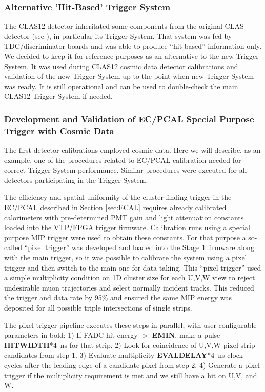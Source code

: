 \subsubsection{Alternative 'Hit-Based' Trigger System}

The CLAS12 detector inheritated some components from the original CLAS detector (see \cite{clas-nim}), in particular its Trigger System. That system was fed by TDC/discriminator boards and was able to produce ``hit-based'' information only. We decided to keep it for reference purposes as an alternative to the new Trigger System. It was used during CLAS12 cosmic data detector calibrations and validation of the new Trigger System up to the point when new Trigger System was ready. It is still operational and can be used to double-check the main CLAS12 Trigger System if needed.

\subsubsection{Development and Validation of EC/PCAL Special Purpose Trigger with Cosmic Data}

The first detector calibrations employed cosmic data. Here we will describe, as an example, one of the procedures related to EC/PCAL calibration needed for correct Trigger System performance. Similar procedures were executed for all detectors participating in the Trigger System.

The efficiency and spatial uniformity of the cluster finding trigger in the EC/PCAL described in Section \ref{sec:ECAL} requires already calibrated calorimeters with pre-determined PMT gain and light attenuation constants loaded into the VTP/FPGA trigger firmware.  Calibration runs using a special purpose MIP trigger were used to obtain these constants. For that purpose a so-called ``pixel trigger'' was developed and loaded into the Stage 1 firmware along with the main trigger, so it was possible to calibrate the system using a pixel trigger and then switch to the main one for data taking. This ``pixel trigger'' used a simple multiplicity condition on 1D cluster size for each U,V,W view to reject undesirable muon trajectories and select normally incident tracks.  This reduced the trigger and data rate by 95$\%$ and ensured the same MIP energy was deposited for all possible triple intersections of single strips.

The pixel trigger pipeline executes these steps in parallel, with user configurable parameters in bold:
  1) If FADC hit energy $>$ \textbf{EMIN}, make a pulse \textbf{HITWIDTH}*4~ns for that strip.
  2) Look for coincidence of U,V,W pixel strip candidates from step 1.
  3) Evaluate multiplicity \textbf{EVALDELAY}*4~ns clock cycles after the leading edge of a candidate pixel from step 2.
  4) Generate a pixel trigger if the multiplicity requirement is met and we still have a hit on U,V, and W. 

